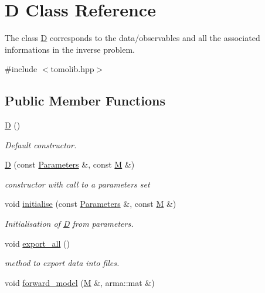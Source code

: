 \hypertarget{class_d}{}\section{D Class Reference}
\label{class_d}


The class \hyperlink{class_d}{D} corresponds to the data/observables and all the associated informations in the inverse problem.  




{\ttfamily \#include $<$tomolib.\+hpp$>$}

\subsection*{Public Member Functions}
\begin{DoxyCompactItemize}
\item 
\hypertarget{class_d_aaa9c0c32402aef951a8c23b6ac6e8913}{}\hyperlink{class_d_aaa9c0c32402aef951a8c23b6ac6e8913}{D} ()\label{class_d_aaa9c0c32402aef951a8c23b6ac6e8913}

\begin{DoxyCompactList}\small\item\em Default constructor. \end{DoxyCompactList}\item 
\hypertarget{class_d_ae3e6197e0e936ea8fcc0f0e0415b0882}{}\hyperlink{class_d_ae3e6197e0e936ea8fcc0f0e0415b0882}{D} (const \hyperlink{class_parameters}{Parameters} \&, const \hyperlink{class_m}{M} \&)\label{class_d_ae3e6197e0e936ea8fcc0f0e0415b0882}

\begin{DoxyCompactList}\small\item\em constructor with call to a parameters set \end{DoxyCompactList}\item 
void \hyperlink{class_d_aae447abcdaa132f565316ee549893d3d}{initialise} (const \hyperlink{class_parameters}{Parameters} \&, const \hyperlink{class_m}{M} \&)
\begin{DoxyCompactList}\small\item\em Initialisation of \hyperlink{class_d}{D} from parameters. \end{DoxyCompactList}\item 
void \hyperlink{class_d_ad985a819e820a7d29fea9324ce5c2c1a}{export\+\_\+all} ()
\begin{DoxyCompactList}\small\item\em method to export data into files. \end{DoxyCompactList}\item 
\hypertarget{class_d_a2a51e07cb62d4e2857b473a479217fec}{}void \hyperlink{class_d_a2a51e07cb62d4e2857b473a479217fec}{forward\+\_\+model} (\hyperlink{class_m}{M} \&, arma\+::mat \&)\label{class_d_a2a51e07cb62d4e2857b473a479217fec}


\end{DoxyCompactItemize}
